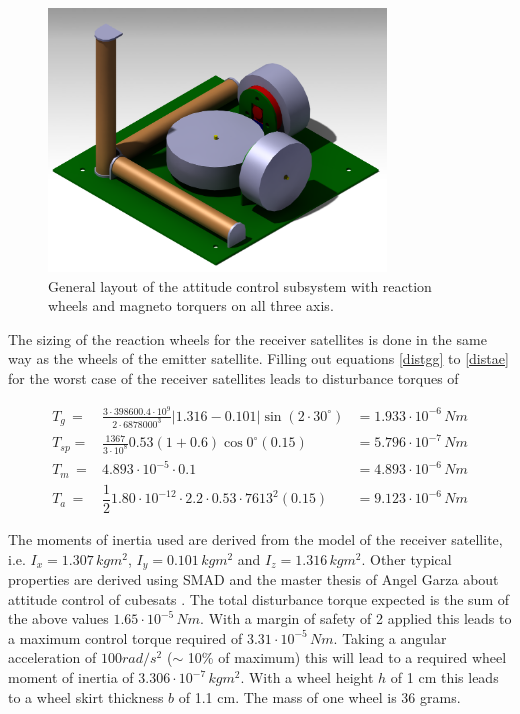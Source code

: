 \begin{figure} [h]
\centering
\includegraphics[width=0.8\textwidth, bb=0 0 1106px 861px]{chapters/img/AC_setup.png}
\caption[General layout of the attitude control subsystem]{General layout of the attitude control subsystem with reaction wheels and magneto torquers on all three axis.}
\label{fig:catacs}
\end{figure}

The sizing of the reaction wheels for the receiver satellites is done in the same way as the wheels of the emitter satellite. Filling out equations \ref{distgg} to \ref{distae} for the worst case of the receiver satellites leads to disturbance torques of 

\begin{eqnarray*}
T_g \,=& \frac{3\cdot 398600.4\cdot 10^9}{2\cdot 6878000^3} \left| 1.316 - 0.101 \right| \sin{\left(2\cdot 30^\circ \right)} &= 1.933\cdot 10^{-6}\,Nm\\
T_{sp} =& \frac{1367}{3\cdot 10^8}0.53\left(1+0.6\right)\cos{0^\circ}\left(0.15\right) &= 5.796 \cdot 10^{-7}\,Nm\\
T_m \,=& 4.893\cdot 10^{-5} \cdot 0.1  &= 4.893 \cdot 10^{-6}\,Nm\\
T_a \,=& \dfrac{1}{2} 1.80 \cdot 10^{-12}\cdot 2.2\cdot 0.53 \cdot 7613^2 \left(0.15\right) &= 9.123 \cdot 10^{-6}\,Nm
\end{eqnarray*}

The moments of inertia used are derived from the model of the receiver satellite, i.e. $I_x = 1.307\,kgm^2$,  $I_y = 0.101\,kgm^2$ and $I_z = 1.316\,kgm^2$. Other typical properties are derived using SMAD \cite{larson} and the master thesis of Angel Garza about attitude control of cubesats  \cite{wheelmotor}. The total disturbance torque expected is the sum of the above values $1.65 \cdot 10^{-5}\,Nm$. With a margin of safety of 2 applied this leads to a maximum control torque required of $3.31\cdot 10^{-5}\, Nm$. Taking a angular acceleration of $100 rad/s^2$ ($\sim$ 10\% of maximum) this will lead to a required wheel moment of inertia of $3.306\cdot 10^{-7}\,kgm^2$. With a wheel height $h$ of 1 cm this leads to a wheel skirt thickness $b$ of 1.1 cm. The mass of one wheel is 36 grams.

